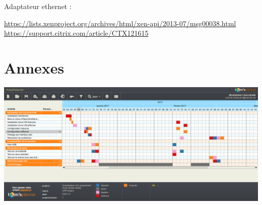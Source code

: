 \documentclass[a4paper,12pt]{extarticle}
\begin{document}
Adaptateur ethernet :

\url{https://lists.xenproject.org/archives/html/xen-api/2013-07/msg00038.html}\\
\url{https://support.citrix.com/article/CTX121615}\\

\clearpage

\section{Annexes}

\begin{center}
\includegraphics[scale=0.70, angle=270]{Gantt2}
\end{center}
\end{document}
